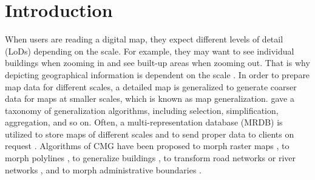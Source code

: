 \documentclass[twocolumn]{svjour3}          %
\begin{document}
\section{Introduction}
\label{sec:introduction}



When users are reading a digital map,
they expect different levels of detail (LoDs) depending on the scale.
For example, they may want to see individual buildings when zooming in
and see built-up areas when zooming out.
That is why depicting geographical information is dependent on the scale
\citep{Muller1995Generalization,Weibel1997}. 
In order to prepare map data for different scales,
a detailed map is generalized to generate coarser data 
for maps at smaller scales,
which is known as map generalization.
\citet{Mackaness2017Generalization} gave a taxonomy of 
generalization algorithms, 
including selection, simplification, aggregation, and so on.
Often, a multi-representation database (MRDB) is utilized to store
maps of different scales and to send proper data to clients on request
\citep[\eg][]{Hampe2004multiple}.
Algorithms of CMG have been proposed 
to morph raster maps
\citep[\eg][]{Pantazis2009a,Pantazis2009b}, 
to morph polylines
\citep[\eg][]{Noellenburg2008,Peng2013LSA,Deng2015,Li2017Annealing,Li2018Fourier},
to generalize buildings
\citep[\eg][]{Li2017_Building,Peng2017Building,Touya2017Progressive},
to transform road networks or river networks
\citep[\eg][]{Suba2016Road,Chimani2014Eat,Huang2017Matrix,Peng2012River},
and to morph administrative boundaries
\citep[\eg][]{Peng2016Admin}.
\end{document}
